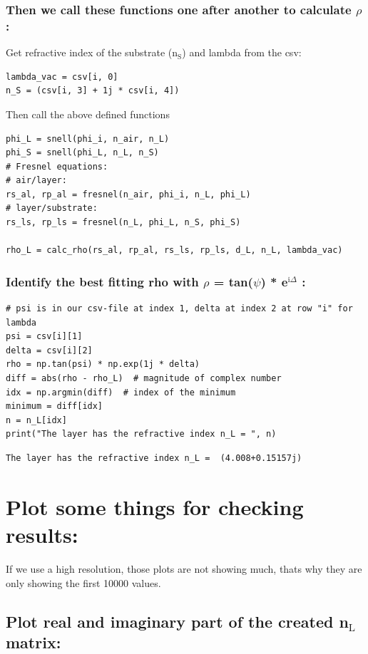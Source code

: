 \documentclass[11pt]{article}
\begin{document}
\subsubsection{Then we call these functions one after another to calculate \(\rho\):}
\label{sec:org9ab8f3a}
Get refractive index of the substrate (n\(_{\text{S}}\)) and lambda from the csv:
\begin{verbatim}
lambda_vac = csv[i, 0]
n_S = (csv[i, 3] + 1j * csv[i, 4])
\end{verbatim}

Then call the above defined functions
\begin{verbatim}
phi_L = snell(phi_i, n_air, n_L)
phi_S = snell(phi_L, n_L, n_S)
# Fresnel equations:
# air/layer:
rs_al, rp_al = fresnel(n_air, phi_i, n_L, phi_L)
# layer/substrate:
rs_ls, rp_ls = fresnel(n_L, phi_L, n_S, phi_S)

rho_L = calc_rho(rs_al, rp_al, rs_ls, rp_ls, d_L, n_L, lambda_vac)
\end{verbatim}


\subsubsection{Identify the best fitting rho with \(\rho\) = tan(\(\psi\)) * e\(^{\text{i}\Delta}\) :}
\label{sec:orgd3a1853}

\begin{verbatim}
# psi is in our csv-file at index 1, delta at index 2 at row "i" for lambda
psi = csv[i][1]
delta = csv[i][2]
rho = np.tan(psi) * np.exp(1j * delta)
diff = abs(rho - rho_L)  # magnitude of complex number
idx = np.argmin(diff)  # index of the minimum
minimum = diff[idx]
n = n_L[idx]
print("The layer has the refractive index n_L = ", n)
\end{verbatim}

\begin{verbatim}
The layer has the refractive index n_L =  (4.008+0.15157j)
\end{verbatim}

\section{Plot some things for checking results:}
\label{sec:org3724f2e}

If we use a high resolution, those plots are not showing much, thats why they are only showing the first 10000 values.
\subsection{Plot real and imaginary part of the created n\(_{\text{L}}\) matrix:}
\label{sec:org2800f96}
\end{document}
